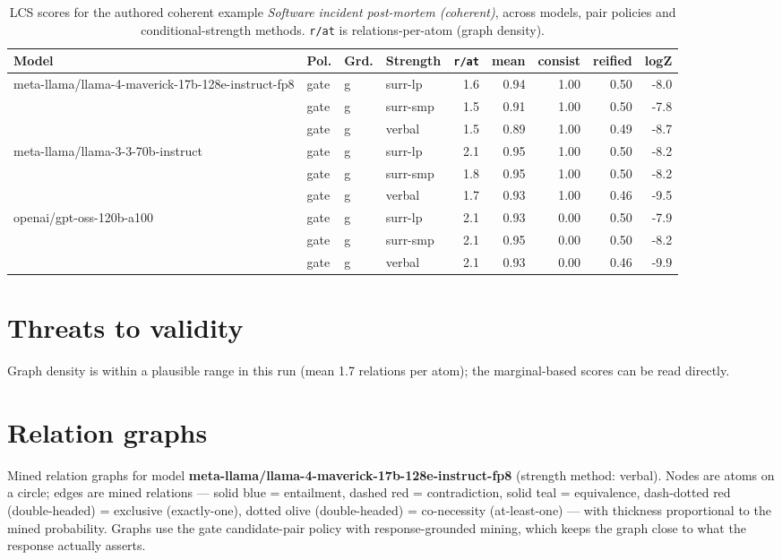 \documentclass[11pt]{article}
\begin{document}
\begin{table}[htbp]
\centering
\footnotesize
\setlength{\tabcolsep}{4pt}
\caption{LCS scores for the authored coherent example \emph{Software incident post-mortem (coherent)}, across models, pair policies and conditional-strength methods. \texttt{r/at} is relations-per-atom (graph density).}
\label{tab:coherent}
\begin{tabular}{llllrrrrr}
\toprule
\textbf{Model} & \textbf{Pol.} & \textbf{Grd.} & \textbf{Strength} & \texttt{r/at} & mean & consist & reified & logZ \\
\midrule
meta-llama/llama-4-maverick-17b-128e-instruct-fp8 & gate & g & surr-lp & 1.6 & 0.94 & 1.00 & 0.50 & -8.0 \\
 & gate & g & surr-smp & 1.5 & 0.91 & 1.00 & 0.50 & -7.8 \\
 & gate & g & verbal & 1.5 & 0.89 & 1.00 & 0.49 & -8.7 \\
\midrule
meta-llama/llama-3-3-70b-instruct & gate & g & surr-lp & 2.1 & 0.95 & 1.00 & 0.50 & -8.2 \\
 & gate & g & surr-smp & 1.8 & 0.95 & 1.00 & 0.50 & -8.2 \\
 & gate & g & verbal & 1.7 & 0.93 & 1.00 & 0.46 & -9.5 \\
\midrule
openai/gpt-oss-120b-a100 & gate & g & surr-lp & 2.1 & 0.93 & 0.00 & 0.50 & -7.9 \\
 & gate & g & surr-smp & 2.1 & 0.95 & 0.00 & 0.50 & -8.2 \\
 & gate & g & verbal & 2.1 & 0.93 & 0.00 & 0.46 & -9.9 \\
\bottomrule
\end{tabular}
\end{table}


\section{Threats to validity}

Graph density is within a plausible range in this run (mean 1.7 relations per atom); the marginal-based scores can be read directly.

\section{Relation graphs}\label{sec:graphs}

Mined relation graphs for model \textbf{meta-llama/llama-4-maverick-17b-128e-instruct-fp8} (strength method: verbal). Nodes are atoms on a circle; edges are mined relations --- solid blue = entailment, dashed red = contradiction, solid teal = equivalence, dash-dotted red (double-headed) = exclusive (exactly-one), dotted olive (double-headed) = co-necessity (at-least-one) --- with thickness proportional to the mined probability. Graphs use the gate candidate-pair policy with response-grounded mining, which keeps the graph close to what the response actually asserts.
\end{document}
